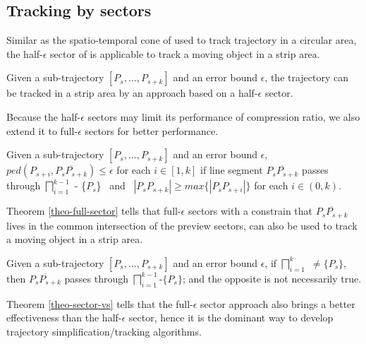 \subsection{Tracking by sectors}

Similar as the spatio-temporal cone of \sed used to track trajectory in a circular area, the half-$\epsilon$ sector of \ped is applicable to track a moving object in a strip area. 



\begin{theorem}
	\label{theo-half-sector}
	Given a sub-trajectory $[P_s,...,P_{s+k}]$ and an error bound $\epsilon$, the trajectory can be tracked in a strip area by an approach based on a half-$\epsilon$ sector.
\end{theorem}

Because the half-$\epsilon$ sectors may limit its performance of compression ratio, we also extend it to full-$\epsilon$ sectors for better performance.

\begin{theorem}
	\label{theo-full-sector}
	Given a sub-trajectory $[P_s,...,P_{s+k}]$ and an error bound $\epsilon$, $ped(P_{s+i}, \overline{P_sP_{s+k}})\le \epsilon$ for each $i \in [1,k]$ if line segment $\overline{P_sP_{s+k}}$ passes through $\bigsqcap_{i=1}^{k-1}$ - \{$P_s$\} ~and~ $|P_sP_{s+k}| \ge max\{|P_sP_{s+i}|\}$ for each $i \in (0, k)$.
\end{theorem}

Theorem \ref{theo-full-sector} tells that full-$\epsilon$ sectors with a constrain that $\overline{P_sP_{s+k}}$ lives in the common intersection of the preview sectors, can also be used to track a moving object in a strip area.

\begin{theorem}
	\label{theo-sector-vs}
	Given a sub-trajectory $[P_s,...,P_{s+k}]$ and an error bound $\epsilon$, if $\bigsqcap_{i=1}^{k}$ $\ne \{P_s\}$, then $\overline{P_sP_{s+k}}$ passes through $\bigsqcap_{i=1}^{k-1}$-$\{P_s\}$; and the opposite is not necessarily true.
\end{theorem}

Theorem \ref{theo-sector-vs} tells that the full-$\epsilon$ sector approach also brings a better effectiveness than the half-$\epsilon$ sector, hence it is the dominant way to develop trajectory simplification/tracking algorithms.


